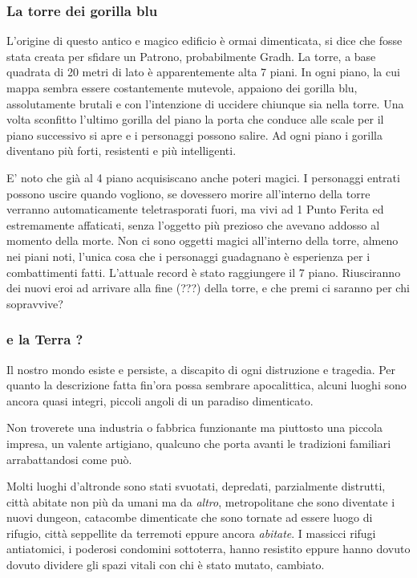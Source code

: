 \begin{multicols}{2}

\subsubsection{La torre dei gorilla blu}

L'origine di questo antico e magico edificio è ormai dimenticata, si dice che fosse stata creata per sfidare un Patrono, probabilmente Gradh. La torre, a base quadrata di 20 metri di lato è apparentemente alta 7 piani. In ogni piano, la cui mappa sembra essere costantemente mutevole, appaiono dei gorilla blu, assolutamente brutali e con l'intenzione di uccidere chiunque sia nella torre. Una volta sconfitto l'ultimo gorilla del piano la porta che conduce alle scale per il piano successivo si apre e i personaggi possono salire. Ad ogni piano i gorilla diventano più forti, resistenti e più intelligenti. 

E' noto che già al 4 piano acquisiscano anche poteri magici. I personaggi entrati possono uscire quando vogliono, se dovessero morire all'interno della torre verranno automaticamente teletrasporati fuori, ma vivi ad 1 Punto Ferita ed estremamente affaticati, senza l'oggetto più prezioso che avevano addosso al momento della morte. Non ci sono oggetti magici all'interno della torre, almeno nei piani noti, l'unica cosa che i personaggi guadagnano è esperienza per i combattimenti fatti. L'attuale record è stato raggiungere il 7 piano. Riusciranno dei nuovi eroi ad arrivare alla fine (???) della torre, e che premi ci saranno per chi sopravvive?

\subsubsection{e la Terra ?}

Il nostro mondo esiste e persiste, a discapito di ogni distruzione e tragedia. Per quanto la descrizione fatta fin'ora possa sembrare apocalittica, alcuni luoghi sono ancora quasi integri, piccoli angoli di un paradiso dimenticato. 

Non troverete una industria o fabbrica funzionante ma piuttosto una piccola impresa, un valente artigiano, qualcuno che porta avanti le tradizioni familiari arrabattandosi come può.

Molti luoghi d'altronde sono stati svuotati, depredati, parzialmente distrutti, città abitate non più da umani ma da \emph{altro}, metropolitane che sono diventate i nuovi dungeon, catacombe dimenticate che sono tornate ad essere luogo di rifugio, città seppellite da terremoti eppure ancora \emph{abitate}. I massicci rifugi antiatomici, i poderosi condomini sottoterra, hanno resistito eppure hanno dovuto dovuto dividere gli spazi vitali con chi è stato mutato, cambiato.


\end{multicols}
